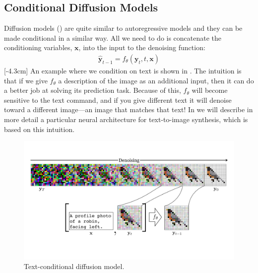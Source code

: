 \subsection{Conditional Diffusion Models}\label{sec:conditional_generative_models:conditional_diffusion_model}
Diffusion models (\sect{\ref{sec:generative_models:diffusion_models}}) are quite similar to autoregressive models and they can be made conditional in a similar way. All we need to do is concatenate the conditioning variables, $\mathbf{x}$, into the input to the denoising function:
\begin{align}
    \hat{\mathbf{y}}_{t-1} = f_{\theta}(\mathbf{y}_t, t, \mathbf{x})
\end{align}
[-4.3cm]
An example where we condition on text is shown in \fig{\ref{fig:conditional_generative_models:text_conditional_diffusion_model}}.
The intuition is that if we give $f_{\theta}$ a description of the image as an additional input, then it can do a better job at solving its prediction task. Because of this, $f_{\theta}$ will become sensitive to the text command, and if you give different text it will denoise toward a different image—an image that matches that text! In \chap{\ref{chapter:VLMs}} we will describe in more detail a particular neural architecture for text-to-image synthesis, which is based on this intuition.
\begin{figure}[h!]
    \centerline{
    \includegraphics[width=1.0\linewidth]{./figures/conditional_generative_models/text_conditional_diffusion_model.pdf}
    }
    \caption{Text-conditional diffusion model.}
    \label{fig:conditional_generative_models:text_conditional_diffusion_model}
\end{figure}

